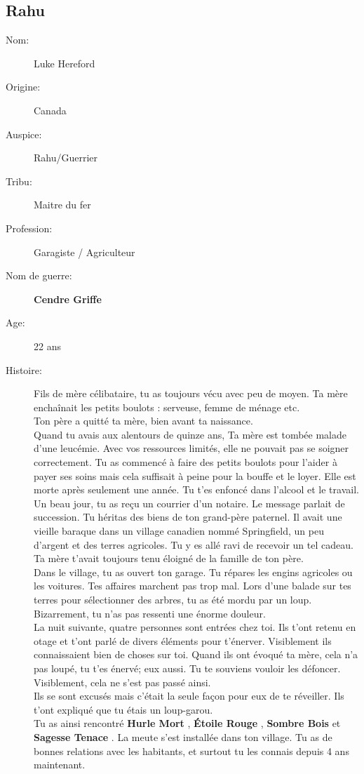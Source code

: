 \documentclass[oneside,12pt]{book}
\newcommand{\Lynn}{\textbf{Étoile Rouge} }
\newcommand{\Jessica}{\textbf{Sagesse Tenace} }
\newcommand{\Luke}{\textbf{Cendre Griffe} }
\newcommand{\Peter}{\textbf{Hurle Mort} }
\newcommand{\Leonard}{\textbf{Sombre Bois} }
\begin{document}
\begin{flushleft}
\section{Rahu}
\begin{description}
\item[Nom:]{Luke Hereford}
\item[Origine:]{Canada}
\item[Auspice:]{Rahu/Guerrier}
\item[Tribu:]{Maitre du fer}
\item[Profession:]{Garagiste / Agriculteur}
\item[Nom de guerre:]{\Luke}
\item[Age:]{22 ans}
\item[Histoire:]{
Fils de mère célibataire, tu as toujours vécu avec peu de moyen. Ta mère enchaînait les petits boulots : 
serveuse, femme de ménage etc.\\
Ton père a quitté ta mère, bien avant ta naissance.\\
Quand tu avais aux alentours de quinze ans, Ta mère est tombée malade d'une leucémie. 
Avec vos ressources limités, elle ne pouvait pas se soigner correctement.
Tu as commencé à faire des petits boulots pour l'aider à payer ses soins mais cela suffisait à peine pour la bouffe
et le loyer. Elle est morte après seulement une année.
Tu t'es enfoncé dans l'alcool et le travail. 
Un beau jour, tu as reçu un courrier d'un notaire. Le message parlait de succession. Tu héritas des biens de ton grand-père paternel. 
Il avait une vieille baraque dans un village canadien nommé Springfield, un peu d'argent et des terres agricoles.
Tu y es allé ravi de recevoir un tel cadeau. Ta mère t'avait toujours tenu éloigné de la famille de ton père. \\
Dans le village, tu as ouvert ton garage. Tu répares les engins agricoles ou les voitures. 
Tes affaires marchent pas trop mal. Lors d'une balade sur tes terres pour sélectionner des arbres, 
tu as été mordu par un loup. 
Bizarrement, tu n'as pas ressenti une énorme douleur. \\
La nuit suivante, quatre personnes sont entrées chez toi. Ils t'ont retenu en otage et t'ont parlé de
divers éléments pour t'énerver. Visiblement ils connaissaient bien de choses sur toi.  
Quand ils ont évoqué ta mère, cela n'a pas loupé, tu t'es énervé; eux aussi. 
Tu te souviens vouloir les défoncer. Visiblement, cela ne s'est pas passé ainsi. \\
Ils se sont excusés mais c'était la seule façon pour eux de te réveiller. 
Ils t'ont expliqué que tu étais un loup-garou.\\
Tu as ainsi rencontré \Peter , \Lynn , \Leonard et \Jessica . 
La meute s'est installée dans ton village.
Tu as de bonnes relations avec les habitants, et surtout tu les connais depuis 4 ans maintenant.\\

}
\end{description}
\end{flushleft}
\end{document}
